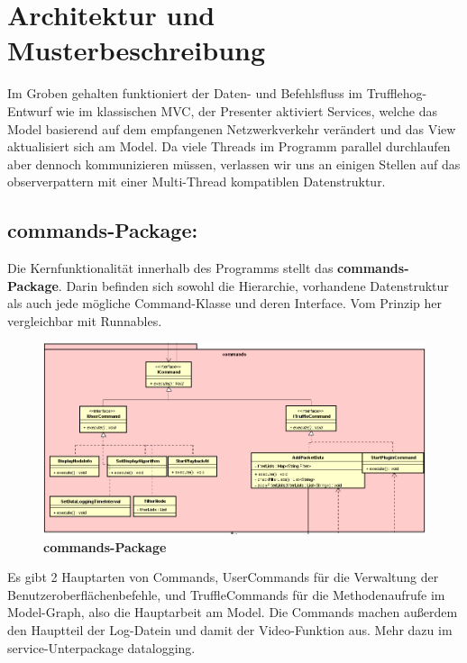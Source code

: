 \chapter{Architektur und Musterbeschreibung}
Im Groben gehalten funktioniert der Daten- und Befehlsfluss im Trufflehog-Entwurf wie im klassischen MVC, der Presenter aktiviert Services, welche das Model basierend auf dem empfangenen Netzwerkverkehr verändert und das View aktualisiert sich am Model. Da viele Threads im Programm parallel durchlaufen aber dennoch kommunizieren müssen, verlassen wir uns an einigen Stellen auf das \gls{observerpattern} mit einer Multi-Thread kompatiblen Datenstruktur.\newline
\newline


\section{\textbf{commands-Package:}}


Die Kernfunktionalität innerhalb des Programms stellt das \textbf{commands-Package}. Darin befinden sich sowohl die Hierarchie, vorhandene Datenstruktur als auch jede mögliche Command-Klasse und deren Interface. Vom Prinzip her vergleichbar mit Runnables.\newline

\begin{figure}[H]
  \centering
  \includegraphics[width=\textwidth]{../diagramimages/commands.png}
  \caption{\textbf{commands-Package}}
\end{figure}

Es gibt 2 Hauptarten von Commands, UserCommands für die Verwaltung der Benutzeroberflächenbefehle, und TruffleCommands für die Methodenaufrufe im Model-Graph, also die Hauptarbeit am Model. Die Commands machen außerdem den Hauptteil der Log-Datein und damit der Video-Funktion aus. Mehr dazu im service-Unterpackage datalogging.

